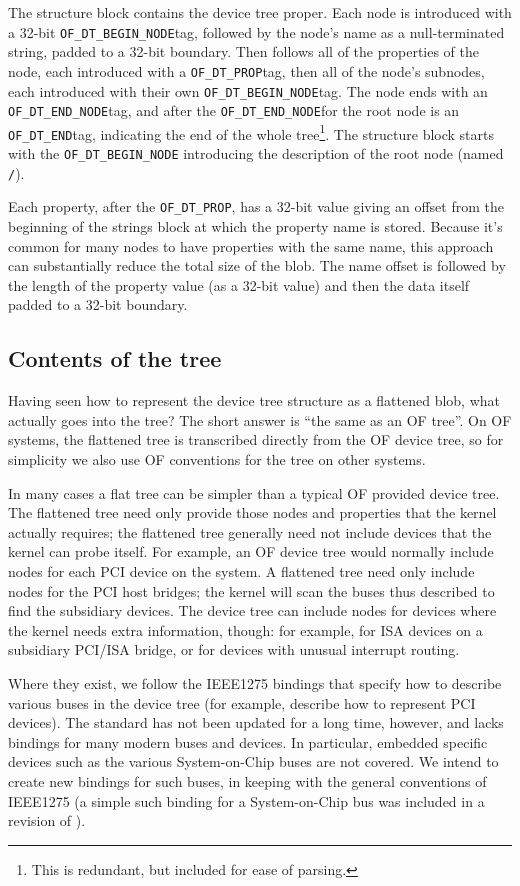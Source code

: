 \documentclass[a4paper,twocolumn]{article}
\newcommand{\dtbeginnode}{\texttt{OF\_DT\_BEGIN\_NODE\xspace}}
\newcommand{\dtendnode}{\texttt{OF\_DT\_END\_NODE\xspace}}
\newcommand{\dtprop}{\texttt{OF\_DT\_PROP\xspace}}
\newcommand{\dtend}{\texttt{OF\_DT\_END\xspace}}
\begin{document}
The structure block contains the device tree proper.  Each node is
introduced with a 32-bit \dtbeginnode tag, followed by the node's name
as a null-terminated string, padded to a 32-bit boundary.  Then
follows all of the properties of the node, each introduced with a
\dtprop tag, then all of the node's subnodes, each introduced with
their own \dtbeginnode tag.  The node ends with an \dtendnode tag, and
after the \dtendnode for the root node is an \dtend tag, indicating
the end of the whole tree\footnote{This is redundant, but included for
ease of parsing.}.  The structure block starts with the \dtbeginnode
introducing the description of the root node (named \texttt{/}).

Each property, after the \dtprop, has a 32-bit value giving an offset
from the beginning of the strings block at which the property name is
stored.  Because it's common for many nodes to have properties with
the same name, this approach can substantially reduce the total size
of the blob.  The name offset is followed by the length of the
property value (as a 32-bit value) and then the data itself padded to
a 32-bit boundary.

\subsection{Contents of the tree}
\label{sec:treecontents}

Having seen how to represent the device tree structure as a flattened
blob, what actually goes into the tree?  The short answer is ``the
same as an OF tree''.  On OF systems, the flattened tree is
transcribed directly from the OF device tree, so for simplicity we
also use OF conventions for the tree on other systems.

In many cases a flat tree can be simpler than a typical OF provided
device tree.  The flattened tree need only provide those nodes and
properties that the kernel actually requires; the flattened tree
generally need not include devices that the kernel can probe itself.
For example, an OF device tree would normally include nodes for each
PCI device on the system.  A flattened tree need only include nodes
for the PCI host bridges; the kernel will scan the buses thus
described to find the subsidiary devices.  The device tree can include
nodes for devices where the kernel needs extra information, though:
for example, for ISA devices on a subsidiary PCI/ISA bridge, or for
devices with unusual interrupt routing.

Where they exist, we follow the IEEE1275 bindings that specify how to
describe various buses in the device tree (for example,
\cite{IEEE1275-pci} describe how to represent PCI devices).  The
standard has not been updated for a long time, however, and lacks
bindings for many modern buses and devices.  In particular, embedded
specific devices such as the various System-on-Chip buses are not
covered.  We intend to create new bindings for such buses, in keeping
with the general conventions of IEEE1275 (a simple such binding for a
System-on-Chip bus was included in \cite{noof5} a revision of
\cite{noof1}).
\end{document}
